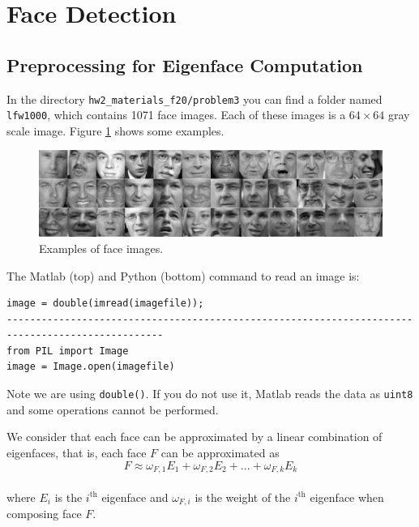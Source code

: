 \section{Face Detection}

\subsection{Preprocessing for Eigenface Computation}

In the directory \texttt{hw2\_materials\_f20/problem3} you can find a folder named \texttt{lfw1000}, which contains 1071 face images. Each of these images is a $64 \times 64$ gray scale image. Figure \ref{face_example} shows some examples.


\begin{figure}[h!]
    \centering
    \includegraphics[scale=0.35]{figs/faces.jpg}
    \caption{Examples of face images.}
    \label{face_example}
\end{figure}


The Matlab (top) and Python (bottom) command to read an image is:
\begin{lstlisting}
image = double(imread(imagefile));
-------------------------------------------------------------------------------------------------
from PIL import Image
image = Image.open(imagefile)
\end{lstlisting}
Note we are using \texttt{double()}. If you do not use it, Matlab reads the data as \texttt{uint8} and some operations cannot be performed.


We consider that each face can be approximated by a linear combination of eigenfaces, that is, each face $F$ can be approximated as
\begin{equation}
  F \approx \omega_{F,1}E_1 + \omega_{F,2}E_2 +...+\omega_{F,k}E_k  
\end{equation}\\
where $E_i$ is the $i^{\text{th}}$ eigenface and $\omega_{F,i}$ is the weight of the $i^{\text{th}}$ eigenface when composing face $F$. 

